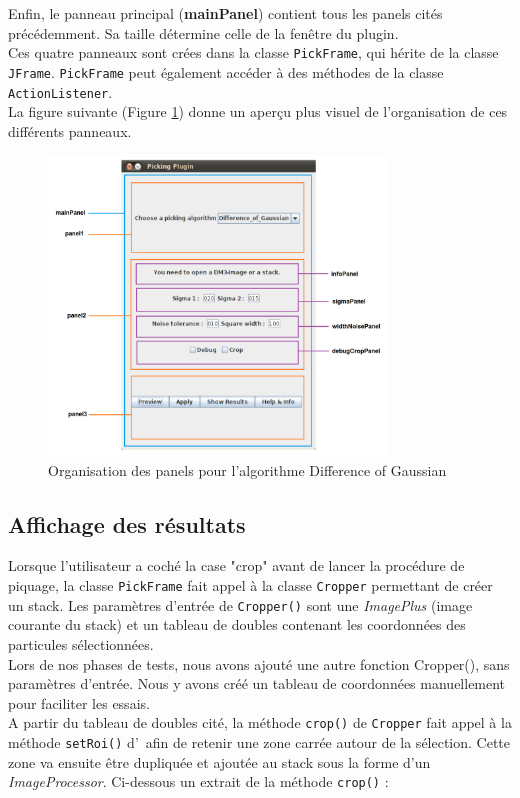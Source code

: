 Enfin, le panneau principal (\textbf{mainPanel}) contient tous les panels cités précédemment. Sa taille détermine celle de la fenêtre du plugin. \\
Ces quatre panneaux sont crées dans la classe \texttt{PickFrame}, qui hérite de la classe \texttt{JFrame}. \texttt{PickFrame} peut également accéder à des méthodes de la classe \texttt{ActionListener}. \\

La figure suivante (Figure \ref{panneauxDetail}) donne un aperçu plus visuel de l'organisation de ces différents panneaux.
\begin{figure}[!ht] 
\begin{center}
\includegraphics[width=0.8\textwidth]{plugin3-1.png}
\caption{Organisation des panels pour l'algorithme Difference of Gaussian}
\label{panneauxDetail}
\end{center}
\end{figure}
\pagebreak

\subsection{Affichage des résultats}

Lorsque l'utilisateur a coché la case "crop" avant de lancer la procédure de piquage, la classe \texttt{PickFrame} fait appel à la classe \texttt{Cropper} permettant de créer un stack. Les paramètres d'entrée de \texttt{Cropper()} sont une \emph{ImagePlus} (image courante du stack) et un tableau de doubles contenant les coordonnées des particules sélectionnées. \\
Lors de nos phases de tests, nous avons ajouté une autre fonction Cropper(), sans paramètres d'entrée. Nous y avons créé un tableau de coordonnées manuellement pour faciliter les essais. \\
A partir du tableau de doubles cité, la méthode \texttt{crop()} de \texttt{Cropper} fait appel à la méthode \texttt{setRoi()} d'\imj ~afin de retenir une zone carrée autour de la sélection. Cette zone va ensuite être dupliquée et ajoutée au stack sous la forme d'un \emph{ImageProcessor}. Ci-dessous un extrait de la méthode \texttt{crop()} :

